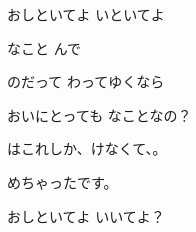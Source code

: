 \documentclass[a4paper,tate,twocolumn,12pt]{ltjtarticle}
\begin{document}
\begin{flushleft}
\begin{minipage}{\linewidth}
おしといてよ いといてよ
\end{minipage}

\vspace{2em}

\noindent\begin{minipage}{\linewidth}
なこと んで

のだって わってゆくなら

おいにとっても なことなの？

はこれしか、けなくて、。

めちゃったです。

おしといてよ いいてよ？
\end{minipage}

\end{flushleft}
\end{document}
